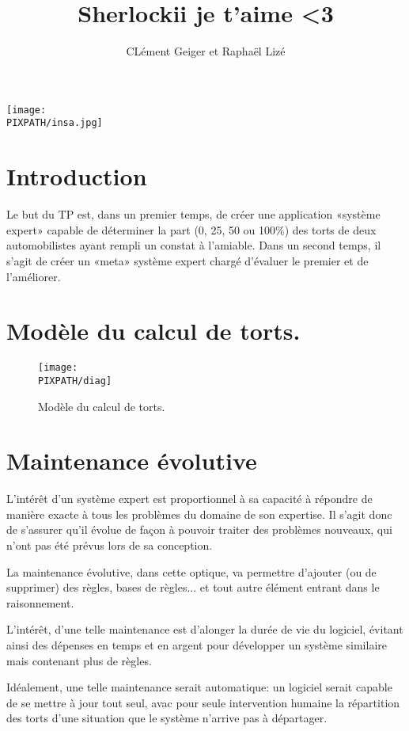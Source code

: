\documentclass[twoside]{article}
\title{Sherlockii je t'aime <3}
\author{CLément Geiger et Raphaël Lizé}
\newcommand\PIXPATH{./docs/pics}
\begin{document}
\large



\maketitle

\thispagestyle{empty}

\vfill

\begin{center}
\texttt{[image: \\PIXPATH/insa.jpg]}
\end{center}

\pagebreak


\section*{Introduction}
Le but du TP est, dans un premier temps,  de créer une application «système expert» capable de
déterminer la part (0, 25, 50 ou 100\%) des torts de deux automobilistes
ayant rempli un constat à l'amiable.
Dans un second temps, il s'agit de créer un «meta» système expert chargé
d'évaluer le premier et de l'améliorer.

\vfill

\section{Modèle du calcul de torts.}
\begin{figure}[!h]
\begin{center}
        \texttt{[image: \\PIXPATH/diag]}
        \caption{Modèle du calcul de torts.}
\end{center}
\end{figure}


\section{Maintenance évolutive}

L'intérêt d'un système expert est proportionnel à sa capacité à répondre
de manière exacte à tous les problèmes du domaine de son expertise. Il 
s'agit donc de s'assurer qu'il évolue de façon à pouvoir traiter des
problèmes nouveaux, qui n'ont pas été prévus lors de sa conception.

La maintenance évolutive, dans cette optique, va permettre d'ajouter (ou
de supprimer) des règles, bases de règles... et tout autre élément entrant
dans le raisonnement.

L'intérêt, d'une telle maintenance est d'alonger la durée de vie du
logiciel, évitant ainsi des dépenses en temps et en argent pour 
développer un système similaire mais contenant plus de règles.

Idéalement, une telle maintenance serait automatique: un logiciel serait
capable de se mettre à jour tout seul, avac pour seule intervention
humaine la répartition des torts d'une situation que le système n'arrive
pas à départager. 

\end{document}
